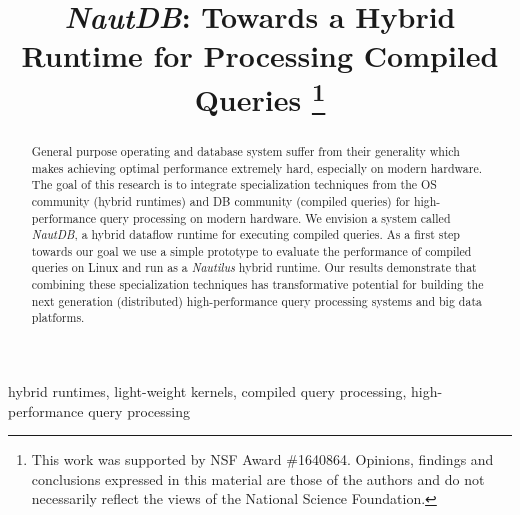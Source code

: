 \documentclass[conference]{IEEEtran}
\begin{document}
\title{\emph{NautDB}: Towards a Hybrid Runtime for Processing Compiled Queries
\thanks{This work was supported by NSF Award \#1640864. Opinions, findings and conclusions expressed in this material are those of the authors and do not necessarily reflect the views of the National Science Foundation.}
}

\author{
}

\newcommand{\todo}[1]{\textcolor{red}{#1}}

\maketitle

\begin{abstract}
General purpose operating and database system suffer from their generality which makes achieving optimal performance extremely hard, especially on modern hardware.
The goal of this research is to integrate specialization techniques from the OS community (hybrid runtimes) and DB community (compiled queries) for high-performance query processing on modern hardware. We envision a system called \emph{NautDB}, a hybrid dataflow runtime for executing compiled queries. As a first step towards our goal we use a simple prototype to evaluate the performance of compiled queries on Linux and run as a \emph{Nautilus} hybrid runtime.
Our results demonstrate that combining these specialization techniques has transformative potential for building the next generation (distributed) high-performance query processing systems and big data platforms.
\end{abstract}

\begin{IEEEkeywords}
hybrid runtimes, light-weight kernels, compiled query processing, high-performance query processing
\end{IEEEkeywords}
\end{document}
